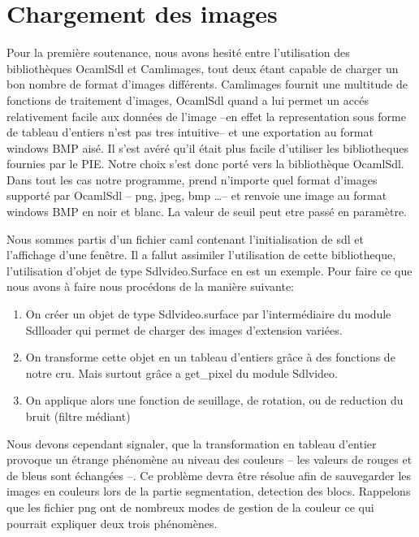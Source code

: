 \documentclass[]{report}
\begin{document}
        \section{Chargement des images} %
        Pour la première soutenance, nous avons hesité entre l'utilisation des bibliothèques OcamlSdl et Camlimages, tout deux étant
        capable de charger un bon nombre de format d'images différents. Camlimages fournit une multitude de fonctions de traitement
        d'images, OcamlSdl quand a lui permet un accés relativement facile aux données de l'image --en effet la representation sous
        forme de tableau d'entiers n'est pas tres intuitive-- et une exportation au format windows BMP aisé.
        Il s'est avéré qu'il était plus facile d'utiliser les bibliotheques fournies par le PIE. Notre choix s'est donc porté vers
        la bibliothèque OcamlSdl.
        Dans tout les cas notre programme, prend n'importe quel format d'images supporté par OcamlSdl -- png, jpeg, bmp \ldots--
        et renvoie une image au format windows BMP en noir et blanc. La valeur de seuil peut etre passé en paramètre.

        \label{sec:Ocamlsdl}
        Nous sommes partis d'un fichier caml contenant l'initialisation de sdl et l'affichage d'une fenêtre. Il a fallut assimiler
        l'utilisation de cette bibliotheque, l'utilisation d'objet de type Sdlvideo.Surface en est un exemple. Pour faire ce que
        nous avons à faire nous procédons de la manière suivante:
        \begin{enumerate}
          \item On créer un objet de type Sdlvideo.surface par l'intermédiaire du module Sdlloader qui permet de charger des
            images d'extension variées.
          \item On transforme cette objet en un tableau d'entiers grâce à des fonctions de notre cru. Mais surtout grâce a
            get_pixel du module Sdlvideo.
          \item On applique alors une fonction de seuillage, de rotation, ou de reduction du bruit (filtre médiant)
        \end{enumerate}
        Nous devons cependant signaler, que la transformation en tableau d'entier provoque un étrange phénomène au niveau des
        couleurs -- les valeurs de rouges et de bleus sont échangées --. Ce problème devra être résolue afin de sauvegarder
        les images en couleurs lors de la partie segmentation, detection des blocs. Rappelons que les fichier png ont de
        nombreux modes de gestion de la couleur ce qui pourrait expliquer deux trois phénomènes.
\end{document}
